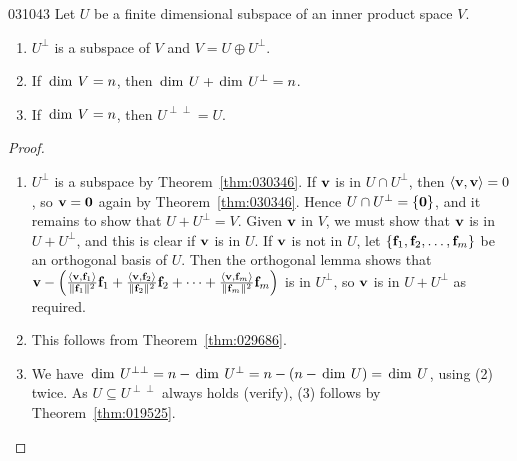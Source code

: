 \begin{theorem}{}{031043}
Let $U$ be a finite dimensional subspace of an inner product space $V$.

\begin{enumerate}
\item $U^{\perp}$ is a subspace of $V$ and $V = U \oplus U^{\perp}$.

\item If $\thinspace\operatorname{dim\medspace} V = n$, then $\thinspace\operatorname{dim\medspace} U + \thinspace\operatorname{dim\medspace} U^{\perp} = n$.

\item If $\thinspace\operatorname{dim\medspace} V = n$, then $U^{\perp\perp} = U$.

\end{enumerate}
\end{theorem}

\begin{proof}
\begin{enumerate}
\item $U^{\perp}$ is a subspace by Theorem~\ref{thm:030346}. If $\textbf{v}$ is in $U \cap U^{\perp}$, then $\langle \textbf{v}, \textbf{v} \rangle = 0$, so $\textbf{v} = \textbf{0}$ again by Theorem~\ref{thm:030346}. Hence $U \cap U^{\perp} = \{\textbf{0}\}$, and it remains to show that $U + U^{\perp} = V$. Given $\textbf{v}$ in $V$, we must show that $\textbf{v}$ is in $U + U^{\perp}$, and this is clear if $\textbf{v}$ is in $U$. If $\textbf{v}$ is not in $U$, let $\{\textbf{f}_{1}, \textbf{f}_{2}, \dots, \textbf{f}_{m}\}$ be an orthogonal basis of $U$. Then the orthogonal lemma shows that 
$
\textbf{v} - \left(
\tfrac{\langle \textbf{v}, \textbf{f}_1 \rangle}{\| \textbf{f}_1 \| ^2} \textbf{f}_1 +
\tfrac{\langle \textbf{v}, \textbf{f}_2 \rangle}{\| \textbf{f}_2 \| ^2} \textbf{f}_2 + \dots +
\tfrac{\langle \textbf{v}, \textbf{f}_m \rangle}{\| \textbf{f}_m \| ^2} \textbf{f}_m 
\right)$ is in $U^{\perp}$, so $\textbf{v}$ is in $U + U^{\perp}$ as required.

\item This follows from Theorem~\ref{thm:029686}.

\item We have $\thinspace\operatorname{dim\medspace} U^{\perp\perp} = n - \thinspace\operatorname{dim\medspace} U^{\perp} = n - (n - \thinspace\operatorname{dim\medspace} U) = \thinspace\operatorname{dim\medspace} U$, using (2) twice. As $U \subseteq U^{\perp\perp}$ always holds (verify), (3) follows by Theorem~\ref{thm:019525}.
\end{enumerate}
\vspace*{-2em}\end{proof}

